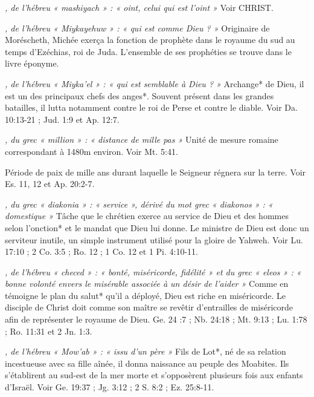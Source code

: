 \begin{multicols}{2}
{\textit{, de l'hébreu « mashiyach » : « oint, celui qui est l'oint »}\newline
Voir CHRIST.

\textit{, de l'hébreu « Miykayehuw » : « qui est comme Dieu ? »}\newline
Originaire de Moréscheth, Michée exerça la fonction de prophète dans le royaume du sud au temps d'Ezéchias, roi de Juda. L'ensemble de ses prophéties se trouve dans le livre éponyme.

\textit{, de l'hébreu « Miyka'el » : « qui est semblable à Dieu ? »}\newline
Archange* de Dieu, il est un des principaux chefs des anges*. Souvent présent dans les grandes batailles, il lutta notamment contre le roi de Perse et contre le diable. Voir Da. 10:13-21 ; Jud. 1:9 et Ap. 12:7.

\textit{, du grec « million » : « distance de mille pas »}\newline
Unité de mesure romaine correspondant à 1480m environ. Voir Mt. 5:41.

\textit{}\newline
Période de paix de mille ans durant laquelle le Seigneur régnera sur la terre. Voir Es. 11, 12 et Ap. 20:2-7.

\textit{, du grec « diakonia » : « service », dérivé du mot grec « diakonos » : « domestique »}\newline
Tâche que le chrétien exerce au service de Dieu et des hommes selon l'onction* et le mandat que Dieu lui donne. Le ministre de Dieu est donc un serviteur inutile, un simple instrument utilisé pour la gloire de Yahweh. Voir Lu. 17:10 ; 2 Co. 3:5 ; Ro. 12 ; 1 Co. 12 et 1 Pi. 4:10-11.

\textit{, de l'hébreu « checed » : « bonté, miséricorde, fidélité » et du grec « eleos » : « bonne volonté envers le misérable associée à un désir de l'aider »}\newline
Comme en témoigne le plan du salut* qu'il a déployé, Dieu est riche en miséricorde. Le disciple de Christ doit comme son maître se revêtir d'entrailles de miséricorde afin de représenter le royaume de Dieu. Ge. 24 :7 ; Nb. 24:18 ; Mt. 9:13 ; Lu. 1:78 ; Ro. 11:31 et 2 Jn. 1:3.

\textit{, de l'hébreu « Mow'ab » : « issu d'un père »}\newline
Fils de Lot*, né de sa relation incestueuse avec sa fille aînée, il donna naissance au peuple des Moabites. Ils s'établirent au sud-est de la mer morte et s'opposèrent plusieurs fois aux enfants d'Israël. Voir Ge. 19:37 ; Jg. 3:12 ; 2 S. 8:2 ; Ez. 25:8-11.

}
\end{multicols}
